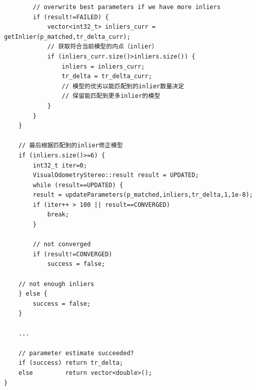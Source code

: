 \documentclass[UTF8]{ctexart}
\begin{document}
\begin{verbatim}
        // overwrite best parameters if we have more inliers
        if (result!=FAILED) {
            vector<int32_t> inliers_curr = getInlier(p_matched,tr_delta_curr);
            // 获取符合当前模型的内点（inlier）
            if (inliers_curr.size()>inliers.size()) {
                inliers = inliers_curr;
                tr_delta = tr_delta_curr;
                // 模型的优劣以能匹配到的inlier数量决定
                // 保留能匹配到更多inlier的模型
            }
        }
    }
    
    // 最后根据匹配到的inlier修正模型
    if (inliers.size()>=6) {
        int32_t iter=0;
        VisualOdometryStereo::result result = UPDATED;
        while (result==UPDATED) {     
        result = updateParameters(p_matched,inliers,tr_delta,1,1e-8);
        if (iter++ > 100 || result==CONVERGED)
            break;
        }

        // not converged
        if (result!=CONVERGED)
            success = false;

    // not enough inliers
    } else {
        success = false;
    }

    ...
    
    // parameter estimate succeeded?
    if (success) return tr_delta;
    else         return vector<double>();
}
    \end{verbatim}
\end{document}
